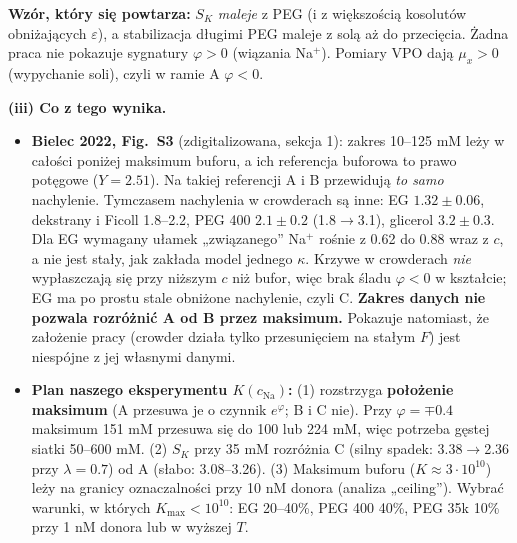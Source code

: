 \documentclass[11pt,a4paper]{article}
\begin{document}
\vspace{-0.4em}
\textbf{Wzór, który się powtarza:} $S_K$ \emph{maleje} z PEG (i z większością kosolutów obniżających $\varepsilon$), a stabilizacja długimi PEG maleje z solą aż do przecięcia. Żadna praca nie pokazuje sygnatury $\varphi>0$ (wiązania Na$^+$). Pomiary VPO dają $\mu_x>0$ (wypychanie soli), czyli w ramie A $\varphi<0$.

\begin{center}\end{center}

\textbf{(iii) Co z tego wynika.}
\begin{itemize}[leftmargin=*]
\item \textbf{Bielec 2022, Fig.~S3} (zdigitalizowana, sekcja 1): zakres 10--125 mM leży w całości poniżej maksimum buforu, a ich referencja buforowa to prawo potęgowe ($Y=2.51$). Na takiej referencji A i B przewidują \emph{to samo} nachylenie. Tymczasem nachylenia w crowderach są inne: EG $1.32\pm0.06$, dekstrany i Ficoll 1.8--2.2, PEG 400 $2.1\pm0.2$ (1.8$\to$3.1), glicerol $3.2\pm0.3$. Dla EG wymagany ułamek „związanego” Na$^+$ rośnie z 0.62 do 0.88 wraz z $c$, a nie jest stały, jak zakłada model jednego $\kappa$. Krzywe w crowderach \emph{nie} wypłaszczają się przy niższym $c$ niż bufor, więc brak śladu $\varphi<0$ w kształcie; EG ma po prostu stale obniżone nachylenie, czyli C. \textbf{Zakres danych nie pozwala rozróżnić A od B przez maksimum.} Pokazuje natomiast, że założenie pracy (crowder działa tylko przesunięciem na stałym $F$) jest niespójne z jej własnymi danymi.
\item \textbf{Plan naszego eksperymentu $K(c_\text{Na})$:} (1) rozstrzyga \textbf{położenie maksimum} (A przesuwa je o czynnik $e^{\varphi}$; B i C nie). Przy $\varphi=\mp0.4$ maksimum 151 mM przesuwa się do 100 lub 224 mM, więc potrzeba gęstej siatki 50--600 mM. (2) $S_K$ przy 35 mM rozróżnia C (silny spadek: 3.38$\to$2.36 przy $\lambda=0.7$) od A (słabo: 3.08--3.26). (3) Maksimum buforu ($K\approx3\cdot10^{10}$) leży na granicy oznaczalności przy 10 nM donora (analiza „ceiling”). Wybrać warunki, w których $K_\text{max}<10^{10}$: EG 20--40\%, PEG 400 40\%, PEG 35k 10\% przy 1 nM donora lub w wyższej $T$.
\end{itemize}
\end{document}
